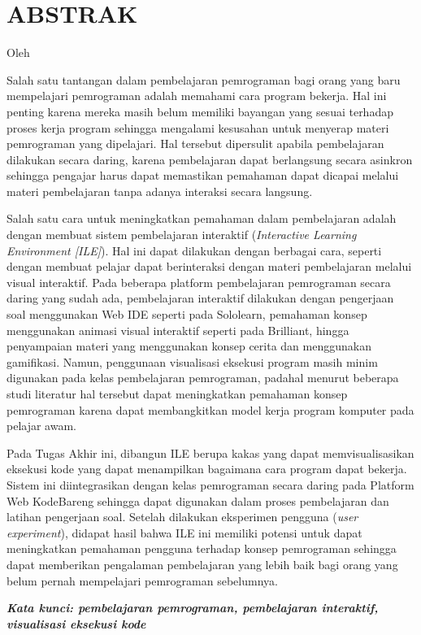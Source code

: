 \clearpage
\chapter*{ABSTRAK}

\begin{center}
  \center
  \large \bfseries \MakeUppercase{\thetitle}

  \normalfont\normalsize
  Oleh

  \theauthor
\end{center}

\vspace{1cm}

\begin{singlespace}
  Salah satu tantangan dalam pembelajaran pemrograman bagi orang yang baru mempelajari pemrograman adalah memahami cara program bekerja. Hal ini penting karena mereka masih belum memiliki bayangan yang sesuai terhadap proses kerja program sehingga mengalami kesusahan untuk menyerap materi pemrograman yang dipelajari. Hal tersebut dipersulit apabila pembelajaran dilakukan secara daring, karena pembelajaran dapat berlangsung secara asinkron sehingga pengajar harus dapat memastikan pemahaman dapat dicapai melalui materi pembelajaran tanpa adanya interaksi secara langsung.

  Salah satu cara untuk meningkatkan pemahaman dalam pembelajaran adalah dengan membuat sistem pembelajaran interaktif (\textit{Interactive Learning Environment [ILE]}). Hal ini dapat dilakukan dengan berbagai cara, seperti dengan membuat pelajar dapat berinteraksi dengan materi pembelajaran melalui visual interaktif. Pada beberapa platform pembelajaran pemrograman secara daring yang sudah ada, pembelajaran interaktif dilakukan dengan pengerjaan soal menggunakan Web IDE seperti pada Sololearn, pemahaman konsep menggunakan animasi visual interaktif seperti pada Brilliant, hingga penyampaian materi yang menggunakan konsep cerita dan menggunakan gamifikasi. Namun, penggunaan visualisasi eksekusi program masih minim digunakan pada kelas pembelajaran pemrograman, padahal menurut beberapa studi literatur hal tersebut dapat meningkatkan pemahaman konsep pemrograman karena dapat membangkitkan model kerja program komputer pada pelajar awam.

  Pada Tugas Akhir ini, dibangun ILE berupa kakas yang dapat memvisualisasikan eksekusi kode yang dapat menampilkan bagaimana cara program dapat bekerja. Sistem ini diintegrasikan dengan kelas pemrograman secara daring pada Platform Web KodeBareng sehingga dapat digunakan dalam proses pembelajaran dan latihan pengerjaan soal. Setelah dilakukan eksperimen pengguna (\textit{user experiment}), didapat hasil bahwa ILE ini memiliki potensi untuk dapat meningkatkan pemahaman pengguna terhadap konsep pemrograman sehingga dapat memberikan pengalaman pembelajaran yang lebih baik bagi orang yang belum pernah mempelajari pemrograman sebelumnya.
\end{singlespace}

\textbf{\textit{Kata kunci: pembelajaran pemrograman, pembelajaran interaktif, visualisasi eksekusi kode}}
\clearpage